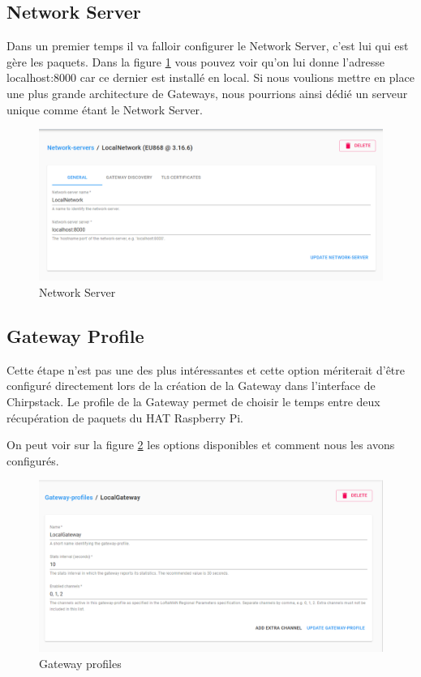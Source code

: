 \documentclass{article}
\begin{document}
		\subsection{Network Server}
			Dans un premier temps il va falloir configurer le Network Server, c'est lui qui est gère les paquets. Dans la figure \ref{fig:networkserver} vous pouvez voir qu'on lui donne l'adresse localhost:8000 car ce dernier est installé en local. Si nous voulions mettre en place une plus grande architecture de Gateways, nous pourrions ainsi dédié un serveur unique comme étant le Network Server.
			\begin{figure}[H]
				\centering
				\includegraphics[width=0.7\linewidth]{networkserver}
				\caption{Network Server}
				\label{fig:networkserver}
			\end{figure}
		
		\subsection{Gateway Profile}
			Cette étape n'est pas une des plus intéressantes et cette option mériterait d'être configuré directement lors de la création de la Gateway dans l'interface de Chirpstack. Le profile de la Gateway permet de choisir le temps entre deux récupération de paquets du HAT Raspberry Pi.
			
			On peut voir sur la figure \ref{fig:gateway-profile} les options disponibles et comment nous les avons configurés. 
			
			\begin{figure}[H]
				\centering
				\includegraphics[width=0.7\linewidth]{gateway-profile}
				\caption{Gateway profiles}
				\label{fig:gateway-profile}
			\end{figure}
		
\end{document}
